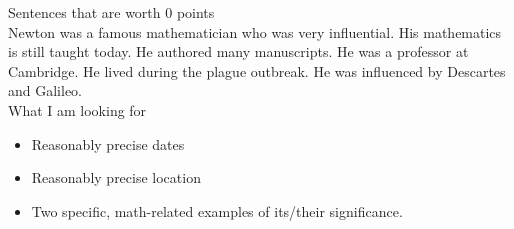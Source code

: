 \documentclass[11pt]{article}
\def\bi{\begin{itemize}}
\def\ei{\end{itemize}}
\begin{document}
\noindent Sentences that are worth 0 points\\

Newton was a famous mathematician who was very influential. His mathematics is still taught today. He authored many manuscripts. He was a professor at Cambridge. He lived during the plague outbreak. He was influenced by Descartes and Galileo.\\


\noindent What I am looking for

\bi
\item Reasonably precise dates
\item Reasonably precise location
\item Two specific, math-related examples of its/their significance.
\ei
\end{document}
